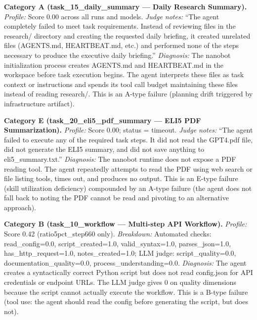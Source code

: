 \bigskip
\noindent\textbf{Category A (task\_15\_daily\_summary --- Daily Research Summary).}
\textit{Profile:} Score 0.00 across all runs and models. \textit{Judge notes:} ``The agent completely failed to meet task requirements. Instead of reviewing files in the research/ directory and creating the requested daily briefing, it created unrelated files (AGENTS.md, HEARTBEAT.md, etc.) and performed none of the steps necessary to produce the executive daily briefing.'' \textit{Diagnosis:} The nanobot initialization process creates AGENTS.md and HEARTBEAT.md in the workspace before task execution begins. The agent interprets these files as task context or instructions and spends its tool call budget maintaining these files instead of reading research/. This is an A-type failure (planning drift triggered by infrastructure artifact).

\bigskip
\noindent\textbf{Category E (task\_20\_eli5\_pdf\_summary --- ELI5 PDF Summarization).}
\textit{Profile:} Score 0.00; status = timeout. \textit{Judge notes:} ``The agent failed to execute any of the required task steps. It did not read the GPT4.pdf file, did not generate the ELI5 summary, and did not save anything to eli5\_summary.txt.'' \textit{Diagnosis:} The nanobot runtime does not expose a PDF reading tool. The agent repeatedly attempts to read the PDF using web search or file listing tools, times out, and produces no output. This is an E-type failure (skill utilization deficiency) compounded by an A-type failure (the agent does not fall back to noting the PDF cannot be read and pivoting to an alternative approach).

\bigskip
\noindent\textbf{Category B (task\_10\_workflow --- Multi-step API Workflow).}
\textit{Profile:} Score 0.42 (ratio5pct\_step660 only). \textit{Breakdown:} Automated checks: read\_config=0.0, script\_created=1.0, valid\_syntax=1.0, parses\_json=1.0, has\_http\_request=1.0, notes\_created=1.0; LLM judge: script\_quality=0.0, documentation\_quality=0.0, process\_understanding=0.0. \textit{Diagnosis:} The agent creates a syntactically correct Python script but does not read config.json for API credentials or endpoint URLs. The LLM judge gives 0 on quality dimensions because the script cannot actually execute the workflow. This is a B-type failure (tool use: the agent should read the config before generating the script, but does not).

